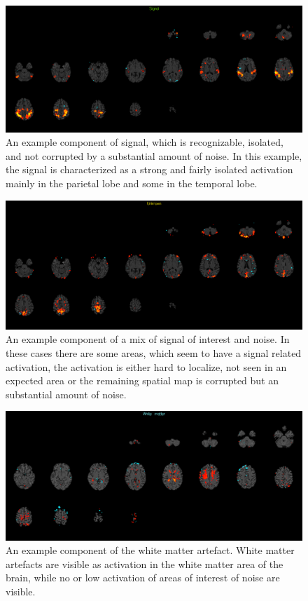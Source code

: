 \begin{figure}[H]                 
	\includegraphics[width=.85\textwidth]{figures/bMethods/signal}  
	\caption{An example component of signal, which is recognizable, isolated, and not corrupted by a substantial amount of noise. In this example, the signal is characterized as a strong and fairly isolated activation mainly in the parietal lobe and some in the temporal lobe.}
	\label{fig:meth:signal} 
\end{figure}



\begin{figure}[H]                 
	\includegraphics[width=.85\textwidth]{figures/bMethods/unknown}  
	\caption{An example component of a mix of signal of interest and noise. In these cases there are some areas, which seem to have a signal related activation, the activation is either hard to localize, not seen in an expected area or the remaining spatial map is corrupted but an substantial amount of noise.}
	\label{fig:meth:unknown} 
\end{figure}


\begin{figure}[H]                 
	\includegraphics[width=.85\textwidth]{figures/bMethods/white_matter}  
	\caption{An example component of the white matter artefact. White matter artefacts are visible as activation in the white matter area of the brain, while no or low activation of areas of interest of noise are visible.}
	\label{fig:meth:walter_white} 
\end{figure}



